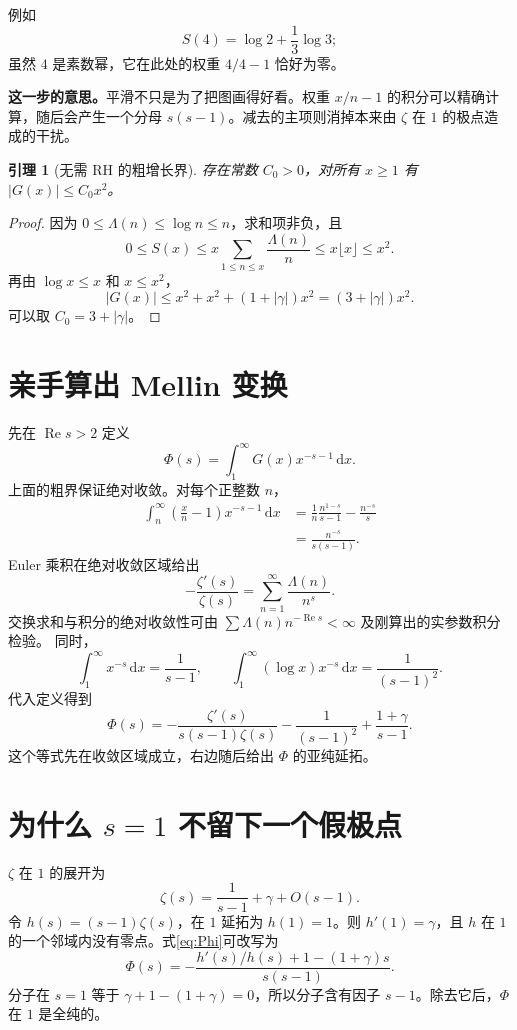 \documentclass[UTF8,fontset=fandol,a4paper,openany,oneside]{ctexbook}
\newtheorem{lemma}[theorem]{引理}
\theoremstyle{definition}
\theoremstyle{remark}
\newcommand{\Rea}{\operatorname{Re}}
\newcommand{\dd}{\,\mathrm d}
\newcommand{\Expl}[1]{\par\smallskip\noindent\textbf{这一步的意思。}#1\par\smallskip}
\begin{document}
例如
\[
S(4)=\log2+\frac13\log3;
\]
虽然 $4$ 是素数幂，它在此处的权重 $4/4-1$ 恰好为零。

\Expl{平滑不只是为了把图画得好看。权重 $x/n-1$ 的积分可以精确计算，随后会产生一个分母 $s(s-1)$。减去的主项则消掉本来由 $\zeta$ 在 $1$ 的极点造成的干扰。}

\begin{lemma}[无需 RH 的粗增长界]
\label{lem:growth}
存在常数 $C_0>0$，对所有 $x\ge1$ 有 $|G(x)|\le C_0x^2$。
\end{lemma}
\begin{proof}
因为 $0\le\Lambda(n)\le\log n\le n$，求和项非负，且
\[
0\le S(x)\le x\sum_{1\le n\le x}\frac{\Lambda(n)}n
\le x\lfloor x\rfloor\le x^2.
\]
再由 $\log x\le x$ 和 $x\le x^2$，
\[
|G(x)|\le x^2+x^2+(1+|\gamma|)x^2
=(3+|\gamma|)x^2.
\]
可以取 $C_0=3+|\gamma|$。
\end{proof}

\section{亲手算出 Mellin 变换}
先在 $\Rea s>2$ 定义
\[
\Phi(s)=\int_1^\infty G(x)x^{-s-1}\dd x.
\]
上面的粗界保证绝对收敛。对每个正整数 $n$，
\begin{align*}
\int_n^\infty\left(\frac{x}{n}-1\right)x^{-s-1}\dd x
&=\frac1n\frac{n^{1-s}}{s-1}-\frac{n^{-s}}s\\
&=\frac{n^{-s}}{s(s-1)}.
\end{align*}
Euler 乘积在绝对收敛区域给出
\[
-\frac{\zeta'(s)}{\zeta(s)}
=\sum_{n=1}^\infty\frac{\Lambda(n)}{n^s}.
\]
交换求和与积分的绝对收敛性可由
$\sum\Lambda(n)n^{-\Rea s}<\infty$ 及刚算出的实参数积分检验。
同时，
\[
\int_1^\infty x^{-s}\dd x=\frac1{s-1},\qquad
\int_1^\infty(\log x)x^{-s}\dd x=\frac1{(s-1)^2}.
\]
代入定义得到
\begin{equation}
\boxed{\displaystyle
\Phi(s)=-\frac{\zeta'(s)}{s(s-1)\zeta(s)}
-\frac1{(s-1)^2}+\frac{1+\gamma}{s-1}.}
\label{eq:Phi}
\end{equation}
这个等式先在收敛区域成立，右边随后给出 $\Phi$ 的亚纯延拓。

\section{为什么 \texorpdfstring{$s=1$}{s=1} 不留下一个假极点}
$\zeta$ 在 $1$ 的展开为
\[
\zeta(s)=\frac1{s-1}+\gamma+O(s-1).
\]
令 $h(s)=(s-1)\zeta(s)$，在 $1$ 延拓为 $h(1)=1$。则
$h'(1)=\gamma$，且 $h$ 在 $1$ 的一个邻域内没有零点。式\eqref{eq:Phi}可改写为
\begin{equation}
\Phi(s)=-\frac{h'(s)/h(s)+1-(1+\gamma)s}{s(s-1)}.
\label{eq:Phi-regularized}
\end{equation}
分子在 $s=1$ 等于 $\gamma+1-(1+\gamma)=0$，所以分子含有因子 $s-1$。除去它后，$\Phi$ 在 $1$ 是全纯的。
\end{document}
